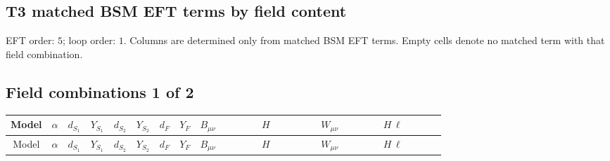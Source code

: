 \documentclass[8pt]{article}
\begin{document}
\begin{landscape}
\section*{T3 matched BSM EFT terms by field content}
EFT order: $5$; loop order: $1$. 
Columns are determined only from matched BSM EFT terms. Empty cells denote no matched term with that field combination.
\tiny
\subsection*{Field combinations 1 of 2}
\begin{longtable}{@{}cccccccc >{\raggedright\arraybackslash}p{0.18\linewidth} >{\raggedright\arraybackslash}p{0.18\linewidth} >{\raggedright\arraybackslash}p{0.18\linewidth} >{\raggedright\arraybackslash}p{0.18\linewidth}@{}}
\toprule
Model & $\alpha$ & $d_{S_1}$ & $Y_{S_1}$ & $d_{S_2}$ & $Y_{S_2}$ & $d_F$ & $Y_F$ & $B_{\mu\nu}$ & $H$ & $W_{\mu\nu}$ & $H\,\ell$ \\
\midrule
\endfirsthead
\toprule
Model & $\alpha$ & $d_{S_1}$ & $Y_{S_1}$ & $d_{S_2}$ & $Y_{S_2}$ & $d_F$ & $Y_F$ & $B_{\mu\nu}$ & $H$ & $W_{\mu\nu}$ & $H\,\ell$ \\
\midrule
\endhead

\end{longtable}
\end{landscape}
\end{document}
